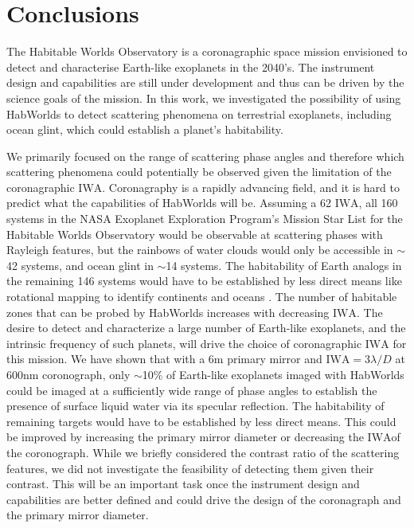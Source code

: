 \documentclass[
    usenatbib,
]{mnras}
\newcommand{\IWA}{\ensuremath{\mathrm{IWA}}}
\newcommand{\hwo}{HabWorlds}
\begin{document}
\section{Conclusions}

The Habitable Worlds Observatory is a coronagraphic space mission envisioned to detect and characterise Earth-like exoplanets in the 2040's. 
%
The instrument design and capabilities are still under development and thus can be driven by the science goals of the mission.
%
In this work, we investigated the possibility of using \hwo{} to detect scattering phenomena on terrestrial exoplanets, including ocean glint, which could establish a planet's habitability. 

We primarily focused on the range of scattering phase angles and therefore which scattering phenomena could potentially be observed given the limitation of the coronagraphic \IWA{}.
%
Coronagraphy is a rapidly advancing field, and it is hard to predict what the capabilities of \hwo{} will be.
%
Assuming a \SI{62}{\mas} \IWA{}, all 160 systems in the NASA Exoplanet Exploration Program's Mission Star List for the Habitable Worlds Observatory would be observable at scattering phases with Rayleigh features, but the rainbows of water clouds would only be accessible in $\sim$42 systems, and ocean glint in $\sim$14 systems.
%
The habitability of Earth analogs in the remaining 146 systems would have to be established by less direct means like rotational mapping to identify continents and oceans \citep[e.g.,][]{2009ApJ...700..915C,lustig2019}.   
%
The number of habitable zones that can be probed by \hwo{} increases with decreasing \IWA{}. 
%
The desire to detect and characterize a large number of Earth-like exoplanets, and the intrinsic frequency of such planets, will drive the choice of coronagraphic \IWA{} for this mission.
%
We have shown that with a $6$m primary mirror and \IWA $= 3\lambda/D$ at $600$nm coronograph, only $\sim$10\% of Earth-like exoplanets imaged with \hwo{} could be imaged at a sufficiently wide range of phase angles to establish the presence of surface liquid water via its specular reflection.  
%
The habitability of remaining targets would have to be established by less direct means.
%
This could be improved by increasing the primary mirror diameter or decreasing the \IWA of the coronograph.
%
While we briefly considered the contrast ratio of the scattering features, we did not investigate the feasibility of detecting them given their contrast. 
%
This will be an important task once the instrument design and capabilities are better defined and could drive the design of the coronagraph and the primary mirror diameter. 
\end{document}
